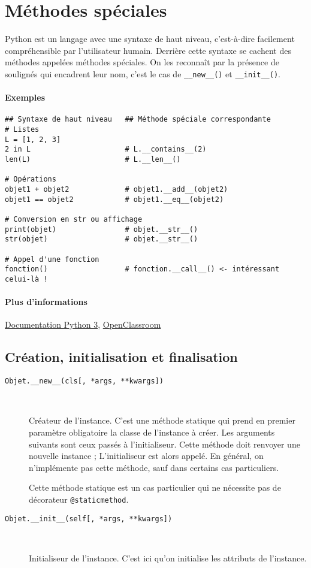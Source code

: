 \section{Méthodes spéciales}
Python est un langage avec une syntaxe de haut niveau, c'est-à-dire facilement compréhensible par l'utilisateur humain. Derrière cette syntaxe se cachent des méthodes appelées méthodes spéciales. On les reconnaît par la présence de soulignés qui encadrent leur nom, c'est le cas de \texttt{__new__()} et \texttt{__init__()}.

\paragraph{Exemples}
\begin{verbatim}
## Syntaxe de haut niveau   ## Méthode spéciale correspondante
# Listes
L = [1, 2, 3]
2 in L                      # L.__contains__(2)
len(L)                      # L.__len__()

# Opérations
objet1 + objet2             # objet1.__add__(objet2)
objet1 == objet2            # objet1.__eq__(objet2)

# Conversion en str ou affichage
print(objet)                # objet.__str__()
str(objet)                  # objet.__str__()

# Appel d'une fonction
fonction()                  # fonction.__call__() <- intéressant celui-là !
\end{verbatim}

\paragraph{Plus d'informations} \href{https://docs.python.org/3/reference/datamodel.html#specialnames}{Documentation Python 3}, \href{https://openclassrooms.com/courses/apprenez-a-programmer-en-python/les-methodes-speciales-1}{OpenClassroom}


\subsection{Création, initialisation et finalisation}
\begin{description}
    \item[\texttt{Objet.__new__(cls[, *args, **kwargs])}]~

    Créateur de l'instance. C'est une méthode statique qui prend en premier paramètre obligatoire la classe de l'instance à créer. Les arguments suivants sont ceux passés à l'initialiseur. Cette méthode doit renvoyer une nouvelle instance ; L'initialiseur est alors appelé. En général, on n'implémente pas cette méthode, sauf dans certains cas particuliers.\medskip

    Cette méthode statique est un cas particulier qui ne nécessite pas de décorateur \texttt{@staticmethod}.

    \item[\texttt{Objet.__init__(self[, *args, **kwargs])}]~

    Initialiseur de l'instance. C'est ici qu'on initialise les attributs de l'instance.
\end{description}

